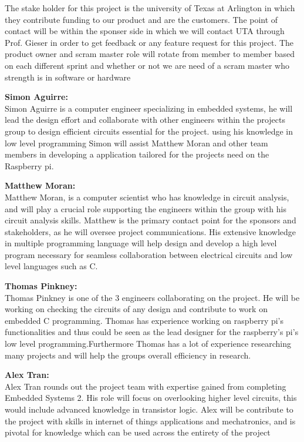 The stake holder for this project is the university of Texas at Arlington in which they contribute funding to our product and are the customers. The point of contact will be within the sponser side in which we will contact UTA through Prof. Gieser in order to get feedback or any feature request for this project. The product owner and scram master role will rotate from member to member based on each different sprint and whether or not we are need of a scram master who strength is in software or hardware

\textbf{Simon Aguirre:} \\
Simon Aguirre is a computer engineer specializing in embedded systems, he will lead the design effort and collaborate with other engineers within the projects group to design efficient circuits essential for the project. using his knowledge in low level programming Simon will assist Matthew Moran and other team members in developing a application tailored for the projects need on the Raspberry pi.


\textbf{Matthew Moran:} \\
Matthew Moran, is a computer scientist who has knowledge in circuit analysis, and will play a crucial role supporting the engineers within the group with his circuit analysis skills. Matthew is the primary contact point for the sponsors and stakeholders, as he will oversee project communications. His extensive knowledge in multiple programming language will help design and develop a high level program necessary for seamless collaboration between electrical circuits and low level languages such as C.


\textbf{Thomas Pinkney:} \\
Thomas Pinkney is one of the 3 engineers collaborating on the project. He will be working on checking the circuits of any design and contribute to work on embedded C programming. Thomas has experience working on raspberry pi's functionalities and thus could be seen as the lead designer for the raspberry's pi's low level programming.Furthermore Thomas has a lot of experience researching many projects and will help the groups overall efficiency in research.

\textbf{Alex Tran:} \\
Alex Tran rounds out the project team with expertise gained from completing Embedded Systems 2. His role will focus on overlooking higher level circuits, this would include advanced knowledge in transistor logic. Alex will be contribute to the project with skills in internet of things applications and mechatronics, and is pivotal for knowledge which can be used across the entirety of the project
